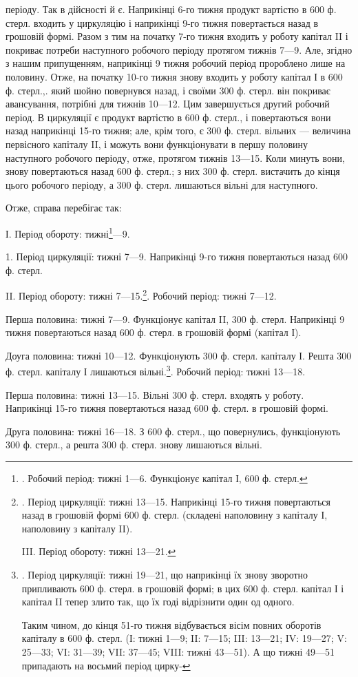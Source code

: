 періоду. Так в дійсності й є. Наприкінці 6-го тижня продукт вартістю
в 600 ф. стерл. входить у циркуляцію і наприкінці 9-го тижня повертається
назад в грошовій формі. Разом з тим на початку 7-го тижня
входить у роботу капітал II і покриває потреби наступного робочого
періоду протягом тижнів 7—9. Але, згідно з нашим припущенням, наприкінці
9 тижня робочий період пророблено лише на половину. Отже, на
початку 10-го тижня знову входить у роботу капітал І в 600 ф. стерл.,.
який шойно повернувся назад, і своїми 300 ф. стерл. він покриває авансування,
потрібні для тижнів 10—12. Цим завершується другий робочий
період. В циркуляції є продукт вартістю в 600 ф. стерл., і повертаються
вони назад наприкінці 15-го тижня; але, крім того, є 300 ф. стерл.
вільних — величина первісного капіталу II, і можуть вони функціонувати
в першу половину наступного робочого періоду, отже, протягом тижнів
13—15. Коли минуть вони, знову повертаються назад 600 ф. стерл.;
з них 300 ф. стерл. вистачить до кінця цього робочого періоду, а
300 ф. стерл. лишаються вільні для наступного.

Отже, справа перебігає так:

І. Період обороту: тижні\footnote{
. Робочий період: тижні 1—6. Функціонує капітал І, 600 ф. стерл.
}—9.

1. Період циркуляції: тижні 7—9. Наприкінці 9-го тижня повертаються
назад 600 ф. стерл.

II. Період обороту: тижні 7—15.\footnote{
. Період циркуляції: тижні 13—15. Наприкінці 15-го тижня повертаються
назад в грошовій формі 600 ф. стерл. (складені наполовину
з капіталу І, наполовину з капіталу II).

III. Період обороту: тижні 13—21.
}. Робочий період: тижні 7—12.

Перша половина: тижні 7—9. Функціонує капітал II, 300 ф. стерл.
Наприкінці 9 тижня повертаються назад 600 ф. стерл. в грошовій формі
(капітал І).

Доуга половина: тижні 10—12. Функціонують 300 ф. стерл. капіталу
І. Решта 300 ф. стерл. капіталу І лишаються вільні.\footnote{
. Період циркуляції: тижні 19—21, що наприкінці їх знову зворотно
припливають 600 ф. стерл. в грошовій формі; в цих 600 ф. стерл.
капітал І і капітал II тепер злито так, що їх годі відрізнити один од одного.

Таким чином, до кінця 51-го тижня відбувається вісім повних оборотів
капіталу в 600 ф. стерл. (І: тижні 1—9; II: 7—15; III: 13—21;
IV: 19—27; V: 25—33; VI: 31—39; VII: 37—45; VIII: тижні
43—51). А що тижні 49—51 припадають на восьмий період цирку-
}. Робочий період: тижні 13—18.

Перша половина: тижні 13—15. Вільні 300 ф. стерл. входять у
роботу. Наприкінці 15-го тижня повертаються назад 600 ф. стерл. в грошовій
формі.

Друга половина: тижні 16—18. З 600 ф. стерл., що повернулись,
функціонують 300 ф. стерл., а решта 300 ф. стерл. знову лишаються
вільні.